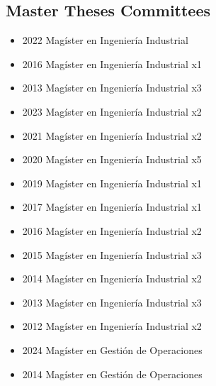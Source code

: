 \clearpage

\subsection{Master Theses Committees}


{\begin{itemize}
    \item 2022 Mag\'ister en Ingenier\'ia Industrial
\end{itemize}
}

{\begin{itemize}
    \item 2016 Mag\'ister en Ingenier\'ia Industrial x1
    \item 2013 Mag\'ister en Ingenier\'ia Industrial x3
\end{itemize}
}

{\begin{itemize}
    \item 2023 Mag\'ister en Ingenier\'ia Industrial x2
    \item 2021 Mag\'ister en Ingenier\'ia Industrial x2
    \item 2020 Mag\'ister en Ingenier\'ia Industrial x5
    \item 2019 Mag\'ister en Ingenier\'ia Industrial x1
    \item 2017 Mag\'ister en Ingenier\'ia Industrial x1
    \item 2016 Mag\'ister en Ingenier\'ia Industrial x2
    \item 2015 Mag\'ister en Ingenier\'ia Industrial x3
    \item 2014 Mag\'ister en Ingenier\'ia Industrial x2
    \item 2013 Mag\'ister en Ingenier\'ia Industrial x3
    \item 2012 Mag\'ister en Ingenier\'ia Industrial x2
\end{itemize}
}

{\begin{itemize}
    \item 2024 Mag\'ister en Gesti\'on de Operaciones
    \item 2014 Mag\'ister en Gesti\'on de Operaciones
\end{itemize}
}

